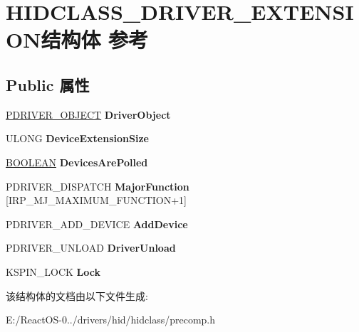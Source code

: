 \hypertarget{struct_h_i_d_c_l_a_s_s___d_r_i_v_e_r___e_x_t_e_n_s_i_o_n}{}\section{H\+I\+D\+C\+L\+A\+S\+S\+\_\+\+D\+R\+I\+V\+E\+R\+\_\+\+E\+X\+T\+E\+N\+S\+I\+O\+N结构体 参考}
\label{struct_h_i_d_c_l_a_s_s___d_r_i_v_e_r___e_x_t_e_n_s_i_o_n}
\subsection*{Public 属性}
\begin{DoxyCompactItemize}
\item 
\mbox{\label{struct_h_i_d_c_l_a_s_s___d_r_i_v_e_r___e_x_t_e_n_s_i_o_n_a6e95464126aeb17ca7a6bf44e1f728f8}} 
\hyperlink{struct___d_r_i_v_e_r___o_b_j_e_c_t}{P\+D\+R\+I\+V\+E\+R\+\_\+\+O\+B\+J\+E\+CT} {\bfseries Driver\+Object}
\item 
\mbox{\label{struct_h_i_d_c_l_a_s_s___d_r_i_v_e_r___e_x_t_e_n_s_i_o_n_af4bd1c89017449c51e9f7d3b65618aeb}} 
U\+L\+O\+NG {\bfseries Device\+Extension\+Size}
\item 
\mbox{\label{struct_h_i_d_c_l_a_s_s___d_r_i_v_e_r___e_x_t_e_n_s_i_o_n_a2900786dd2f2c3637fac114ace319bef}} 
\hyperlink{_processor_bind_8h_a112e3146cb38b6ee95e64d85842e380a}{B\+O\+O\+L\+E\+AN} {\bfseries Devices\+Are\+Polled}
\item 
\mbox{\label{struct_h_i_d_c_l_a_s_s___d_r_i_v_e_r___e_x_t_e_n_s_i_o_n_ae9c487e71b526de6df16f5cdb5bc2360}} 
P\+D\+R\+I\+V\+E\+R\+\_\+\+D\+I\+S\+P\+A\+T\+CH {\bfseries Major\+Function} \mbox{[}I\+R\+P\+\_\+\+M\+J\+\_\+\+M\+A\+X\+I\+M\+U\+M\+\_\+\+F\+U\+N\+C\+T\+I\+ON+1\mbox{]}
\item 
\mbox{\label{struct_h_i_d_c_l_a_s_s___d_r_i_v_e_r___e_x_t_e_n_s_i_o_n_a3274ddb7cf7d3ab3c69c4571b63beb5a}} 
P\+D\+R\+I\+V\+E\+R\+\_\+\+A\+D\+D\+\_\+\+D\+E\+V\+I\+CE {\bfseries Add\+Device}
\item 
\mbox{\label{struct_h_i_d_c_l_a_s_s___d_r_i_v_e_r___e_x_t_e_n_s_i_o_n_a925e1886bef1d014021655eb279af388}} 
P\+D\+R\+I\+V\+E\+R\+\_\+\+U\+N\+L\+O\+AD {\bfseries Driver\+Unload}
\item 
\mbox{\label{struct_h_i_d_c_l_a_s_s___d_r_i_v_e_r___e_x_t_e_n_s_i_o_n_acffe076fcd5adc8b6b5db33aa588c49a}} 
K\+S\+P\+I\+N\+\_\+\+L\+O\+CK {\bfseries Lock}
\end{DoxyCompactItemize}


该结构体的文档由以下文件生成\+:\begin{DoxyCompactItemize}
\item 
E\+:/\+React\+O\+S-\/0../drivers/hid/hidclass/precomp.\+h\end{DoxyCompactItemize}
